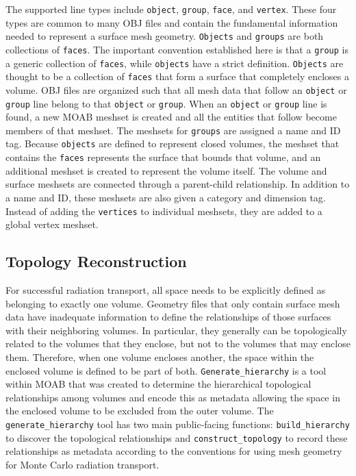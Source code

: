 \documentclass{anstrans}
\begin{document}
The supported line types include \texttt{object}, \texttt{group},
\texttt{face}, and \texttt{vertex}.  These four types are common to many OBJ
files and contain the fundamental information needed to represent a surface
mesh geometry.  \texttt{Objects} and \texttt{groups} are both collections of
\texttt{faces}.  The important convention established here is that a
\texttt{group} is a generic collection of \texttt{faces}, while
\texttt{objects} have a strict definition.  \texttt{Objects} are thought to be a 
collection of \texttt{faces} that form a surface that completely encloses a volume.
OBJ files are organized such that all mesh data that follow
an \texttt{object} or \texttt{group} line belong to that \texttt{object} or
\texttt{group}.  When an \texttt{object} or \texttt{group} line is found, a
new MOAB meshset is created and all the entities that follow become members of
that meshset.  The meshsets for \texttt{groups} are assigned a name and
ID tag.  Because \texttt{objects} are defined to represent closed volumes, the
meshset that contains the \texttt{faces} represents the surface that bounds
that volume, and an additional meshset is created to represent the volume
itself.  The volume and surface meshsets are connected through a parent-child
relationship.  In addition to a name and ID, these meshsets are also given a
category and dimension tag.  Instead of adding the \texttt{vertices} to individual
meshsets, they are added to a global vertex meshset.

\subsection{Topology Reconstruction}
For successful radiation transport, all space needs to be explicitly defined
as belonging to exactly one volume.  Geometry files that only
contain surface mesh data have inadequate information to define the
relationships of those surfaces with their neighboring volumes.  In
particular, they generally can be topologically related to the volumes that
they enclose, but not to the volumes that may enclose them.  Therefore, when
one volume encloses another, the space within the enclosed volume is defined
to be part of both. \texttt{Generate\_hierarchy} is a tool within MOAB
that was created to determine the hierarchical topological
relationships among volumes and encode this as metadata allowing the space in the enclosed
volume to be excluded from the outer volume.  The \texttt{generate\_hierarchy} tool has two main
public-facing functions: \texttt{build\_hierarchy} to discover the topological
relationships and \texttt{construct\_topology} to record these relationships as
metadata according to the conventions for using mesh geometry for Monte
Carlo radiation transport.
\end{document}
